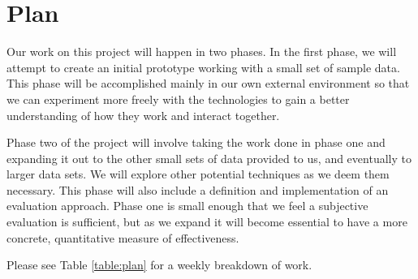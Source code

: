 \chapter{Plan}\label{ch:plan}

Our work on this project will happen in two phases. In the first phase, we will attempt to create an initial prototype working with a small set of sample data. This phase will be accomplished mainly in our own external environment so that we can experiment more freely with the technologies to gain a better understanding of how they work and interact together. 

Phase two of the project will involve taking the work done in phase one and expanding it out to the other small sets of data provided to us, and eventually to larger data sets. We will explore other potential techniques as we deem them necessary. This phase will also include a definition and implementation of an evaluation approach. Phase one is small enough that we feel a subjective evaluation is sufficient, but as we expand it will become essential to have a more concrete, quantitative measure of effectiveness.

Please see Table \ref{table:plan} for a weekly breakdown of work.

